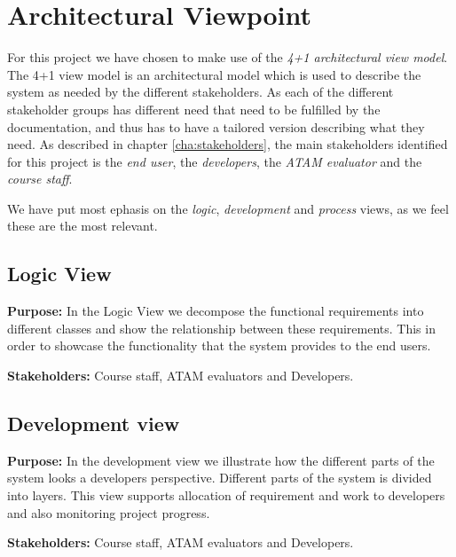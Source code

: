 \chapter{Architectural Viewpoint}
\label{cha:architectural_viewpoint}
For this project we have chosen to make use of the \emph{4+1 architectural view model}. The 4+1 view model is an architectural model which is used to describe the system as needed by the different stakeholders. As each of the different stakeholder groups has different need that need to be fulfilled by the documentation, and thus has to have a tailored version describing what they need. As described in chapter \ref{cha:stakeholders}, the main stakeholders identified for this project is the \emph{end user}, the \emph{developers}, the \emph{ATAM evaluator} and the \emph{course staff}.


We have put most ephasis on the \emph{logic}, \emph{development} and \emph{process} views, as we feel these are the most relevant.


    \section{Logic View}
    \textbf{Purpose:} In the Logic View we decompose the functional requirements into different classes and show the relationship between these requirements. This in order to showcase the functionality that the system provides to the end users.    
    
    \noindent\textbf{Stakeholders:} Course staff, ATAM evaluators and Developers.
    
    


    \section{Development view}
    \textbf{Purpose:} In the development view we illustrate how the different parts of the system looks a developers perspective. Different parts of the system is divided into layers. This view supports allocation of requirement and work to developers and also monitoring project progress.  
    
    \noindent\textbf{Stakeholders:} Course staff, ATAM evaluators and Developers.
    
    

